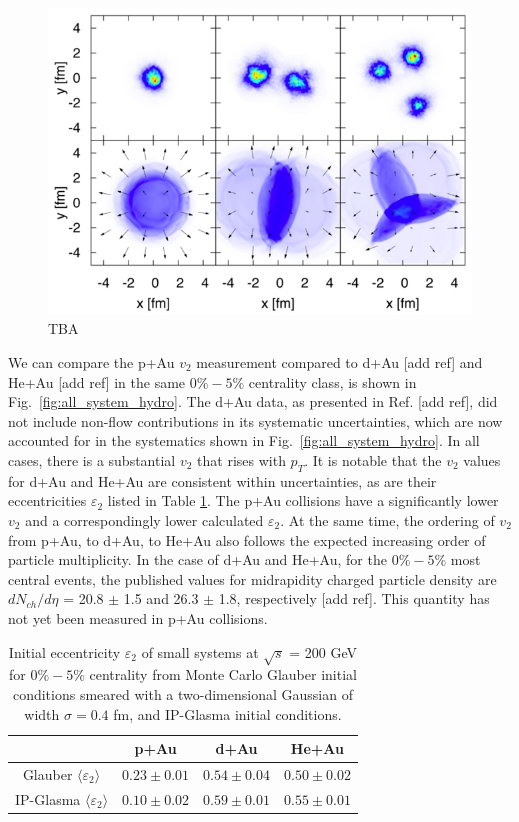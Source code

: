\begin{figure}
\begin{center}
\includegraphics[width=0.75\linewidth]{figs/initial_condition_comparison.png}
\caption{TBA}
\label{fig:initial_condition_comparison}
\end{center}
\end{figure}
We can compare the p+Au $v_2$ measurement compared to d+Au
[add ref] %
and He+Au
[add ref]
in the same $0\%-5\%$ centrality class, is shown in Fig.~\ref{fig:all_system_hydro}. The d+Au data, as presented in Ref.
[add ref], did not include non-flow contributions in its systematic uncertainties, which are now accounted for in the systematics shown in Fig.~\ref{fig:all_system_hydro}. In all cases, there is a substantial $v_2$ that rises with $p_T$. It is notable that the $v_2$ values for d+Au and He+Au are consistent within uncertainties, as are their eccentricities $\varepsilon_2$ listed in Table \ref{table_geometry_glasma}. The p+Au collisions have a significantly lower $v_2$ and a correspondingly lower calculated $\varepsilon_2$. At the same time, the ordering of $v_2$ from p+Au, to d+Au, to He+Au also follows the expected increasing order of particle multiplicity. In the case of d+Au and He+Au, for the $0\%-5\%$ most central events, the published values for midrapidity charged particle density are $dN_{ch}/d\eta$ = 20.8 $\pm$ 1.5 and 26.3 $\pm$ 1.8, respectively
[add ref]. This quantity has not yet been measured in p+Au collisions.
\begin{table}[h!]
\caption{Initial eccentricity $\varepsilon_2$ of small systems at $\sqrt{s}$ = 200 GeV for $0\%-5\%$ centrality from Monte Carlo Glauber initial conditions smeared with a two-dimensional Gaussian of width $\sigma=0.4$ fm, and IP-Glasma initial conditions.}
\begin{tabular}{c c c c}
\label{table_geometry_glasma}
 & p+Au & d+Au & He+Au \\ \hline
 Glauber $\langle \varepsilon_2 \rangle$ & $0.23\pm 0.01$ & $0.54\pm 0.04$ & $0.50\pm 0.02$ \\
 IP-Glasma $\langle \varepsilon_2 \rangle$ & $0.10\pm 0.02$ & $0.59\pm 0.01$ & $0.55\pm 0.01$ \\
\end{tabular}
\end{table}

